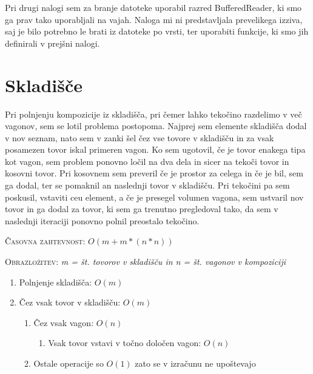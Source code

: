 \documentclass{article}
\begin{document}
Pri drugi nalogi sem za branje datoteke uporabil razred BufferedReader, ki smo ga prav tako uporabljali na vajah. Naloga mi ni predstavljala prevelikega izziva, saj je bilo potrebno le brati iz datoteke po vrsti, ter uporabiti funkcije, ki smo jih definirali v prejšni nalogi.


\section{Skladišče}

Pri polnjenju kompozicije iz skladišča, pri čemer lahko tekočino razdelimo v več vagonov, sem se lotil problema postopoma. Najprej sem elemente skladišča dodal v nov seznam, nato sem v zanki šel čez vse tovore v skladišču in za vsak posamezen tovor iskal primeren vagon. Ko sem ugotovil, če je tovor enakega tipa kot vagon, sem problem ponovno ločil na dva dela in sicer na tekoči tovor in kosovni tovor. Pri kosovnem sem preveril če je prostor za celega in če je bil, sem ga dodal, ter se pomaknil an naslednji tovor v skladišču. Pri tekočini pa sem poskusil, vstaviti ceu element, a če je presegel volumen vagona, sem ustvaril nov tovor in ga dodal za tovor, ki sem ga trenutno pregledoval tako, da sem v naslednji iteraciji ponovno polnil preostalo tekočino.\\
\begin{center}
    \textsc{Časovna zahtevnost:}
    $O({m + m*(n*n)})$\vspace{5mm}
    
    \textsc{Obrazložitev}: \emph{m = št. tovorov v skladišču in n = št. vagonov v kompoziciji}\\
    \begin{enumerate}
    	\item Polnjenje skladišča: $O({m})$
        \item Čez vsak tovor v skladišču: $O({m})$
        \begin{enumerate}
        	\item Čez vsak vagon: $O({n})$
            \begin{enumerate}
        		\item Vsak tovor vstavi v točno določen vagon: $O({n})$
        	\end{enumerate}
        \item Ostale operacije so $O({1})$ zato se v izračunu ne upoštevajo
        \end{enumerate}
    \end{enumerate}
 \end{center}

\end{document}
